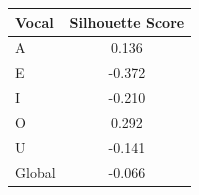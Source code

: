 \begin{tabular}{lc}
\toprule
\rowcolor{col01}
Vocal & Silhouette Score \\
\midrule
A & 0.136 \\
E & -0.372 \\
I & -0.210 \\
O & 0.292 \\
U & -0.141 \\
Global & -0.066 \\
\bottomrule
\end{tabular}
